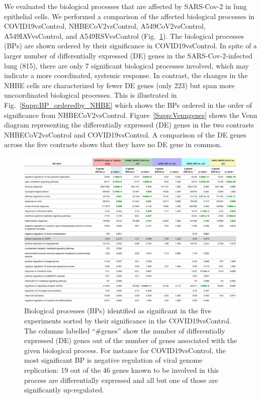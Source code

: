 We evaluated the biological processes that are affected by SARS-Cov-2 in lung epithelial cells.  We performed a  comparison of the affected biological processes in COVID19vsControl, NHBECoV2vsControl, A549CoV2vsControl, A549IAVvsControl, and A549RSVvsControl (Fig.~\ref{Supp:BPs}). 
The biological processes (BPs) are shown ordered by their significance  in  COVID19vsControl.  
In spite of a larger number of differentially expressed (DE) genes in the SARS-Cov-2-infected lung (815), there are only 7 significant biological processes involved, which may indicate a more coordinated, systemic response. In contrast, the changes in the NHBE cells are characterized by fewer DE genes (only 223) but span more uncoordinated biological processes. 
This is illustrated in Fig.~\ref{Supp:BP_orderedby_NHBE} which shows the BPs ordered in the order of significance from NHBECoV2vsControl.
Figure~\ref{Supp:Venngenes} shows the Venn diagram representing the differentially expressed (DE) genes in the two contrasts NHBECoV2vsControl and COVID19vsControl. 
A comparison of the DE genes across the five contrasts shows that they have no DE gene in common.

\begin{figure}
\centering
	 \includegraphics[width=1\linewidth]{Figures/BPs_elim_FDR_all.png}
    \caption{Biological processes (BPs) identified as significant in the five experiments sorted by their significance in the COVID19vsControl. The  columns labelled ``\#genes'' show the number of differentially expressed (DE) genes out of the number of genes associated with the given biological process.  For instance for COVID19vsControl, the most significant BP is negative regulation of viral genome replication: 19 out of the 46 genes known to be involved in this process are differentially expressed and all but one of those are significantly up-regulated.  \label{Supp:BPs}}
        
\end{figure}


